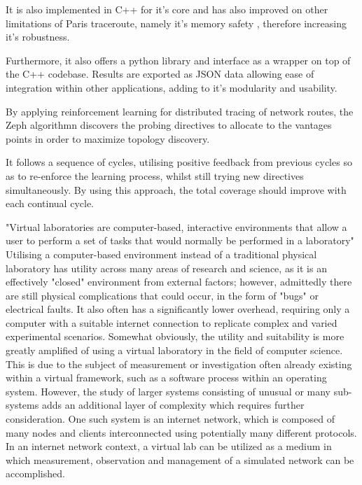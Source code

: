 It is also implemented in C++ for it's core and has also improved on other limitations of Paris traceroute, namely it's memory safety \cite{dublin}, therefore increasing it's robustness. 

Furthermore, it also offers a python library and interface as a wrapper on top of the C++ codebase. Results are exported as JSON data allowing ease of integration within other applications, adding to it's modularity and usability. \cite{dublin_website}

By applying reinforcement learning for distributed tracing of network routes, the Zeph algorithmn discovers the probing directives to allocate to the vantages points in order to maximize topology discovery. 

It follows a sequence of cycles, utilising positive feedback from previous cycles so as to re-enforce the learning process, whilst still trying new directives simultaneously. By using this approach, the total coverage should improve with each continual cycle. \cite{zephMap}

"Virtual laboratories are computer-based, interactive environments that allow a user to perform a set of tasks that would normally be performed in a laboratory" \cite{india_virtual}
Utilising a computer-based environment instead of a traditional physical laboratory has utility across many areas of research and science, as it is an effectively "closed" environment from external factors; however, admittedly there are still physical complications that could occur, in the form of "bugs" or electrical faults. It also often has a significantly lower overhead, requiring only a computer with a suitable internet connection to replicate complex and varied experimental scenarios. Somewhat obviously, the utility and suitability is more greatly amplified of using a virtual laboratory in the field of computer science. This is due to the subject of measurement or investigation often already existing within a virtual framework, such as a software process within an operating system. However, the study of larger systems consisting of unusual or many sub-systems adds an additional layer of complexity which requires further consideration. One such system is an internet network, which is composed of many nodes and clients interconnected using potentially many different protocols. In an internet network context, a virtual lab can be utilized as a medium in which measurement, observation and management of a simulated network can be accomplished. \cite{virtual_network_lab} 

